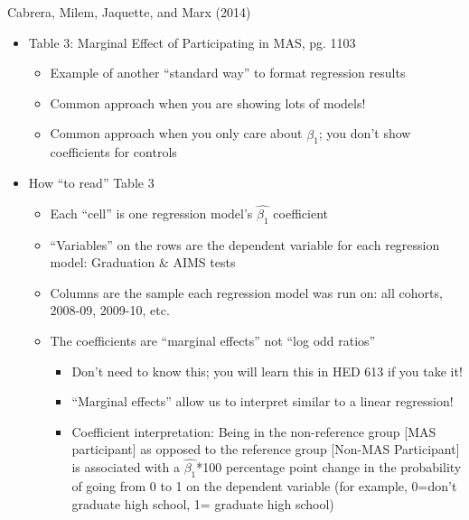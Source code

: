\documentclass[8pt,ignorenonframetext,dvipsnames]{beamer}
\providecommand{\tightlist}{%
  \setlength{\itemsep}{0pt}\setlength{\parskip}{0pt}}
\let\olditem\item
\renewcommand{\item}{%
  \olditem\vspace{4pt}
}
\begin{document}
\begin{frame}{Cabrera, Milem, Jaquette, and Marx (2014)}
\protect\hypertarget{cabrera-milem-jaquette-and-marx-2014-1}{}

\begin{itemize}
\tightlist
\item
  Table 3: Marginal Effect of Participating in MAS, pg. 1103

  \begin{itemize}
  \tightlist
  \item
    Example of another ``standard way'' to format regression results
  \item
    Common approach when you are showing lots of models!
  \item
    Common approach when you only care about \(\hat{\beta_1}\); you
    don't show coefficients for controls
  \end{itemize}
\end{itemize}

\medskip

\begin{itemize}
\tightlist
\item
  How ``to read'' Table 3

  \begin{itemize}
  \tightlist
  \item
    Each ``cell'' is one regression model's \(\hat{\beta_1}\)
    coefficient
  \item
    ``Variables'' on the rows are the dependent variable for each
    regression model: Graduation \& AIMS tests
  \item
    Columns are the sample each regression model was run on: all
    cohorts, 2008-09, 2009-10, etc.
  \item
    The coefficients are ``marginal effects'' not ``log odd ratios''

    \begin{itemize}
    \tightlist
    \item
      Don't need to know this; you will learn this in HED 613 if you
      take it!
    \item
      ``Marginal effects'' allow us to interpret similar to a linear
      regression!
    \item
      Coefficient interpretation: Being in the non-reference group
      {[}MAS participant{]} as opposed to the reference group {[}Non-MAS
      Participant{]} is associated with a \(\hat{\beta_1}\)*100
      percentage point change in the probability of going from 0 to 1 on
      the dependent variable (for example, 0=don't graduate high school,
      1= graduate high school)
    \end{itemize}
  \end{itemize}
\end{itemize}

\end{frame}
\end{document}
